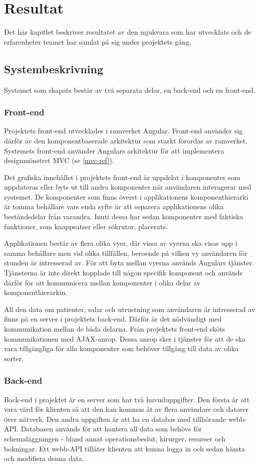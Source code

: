 \chapter{Resultat}
Det här kapitlet beskriver resultatet av den mjukvara som har utvecklats och de erfarenheter
teamet har samlat på sig under projektets gång.

\section{Systembeskrivning}
Systemet som skapats består av två separata delar, en back-end och en front-end.

\subsection{Front-end}
Projektets front-end utvecklades i ramverket Angular. Front-end använder sig därför av den komponentbaserade arkitektur som starkt förordas av ramverket. Systemets front-end använder Angulars arkitektur för att implementera designmönstret MVC (se \ref{mvc-ref}).

Det grafiska innehållet i projektets front-end är uppdelat i komponenter som uppdateras eller byts ut till andra komponenter när användaren interagerar med systemet. De komponenter som finns överst i applikationens komponenthierarki är tomma behållare vars enda syfte är att separera applikationens olika beståndsdelar från varandra. Inuti dessa har sedan komponenter med faktiska funktioner, som knappsatser eller sökrutor, placerats.

Applikationen består av flera olika vyer, där vissa av vyerna ska visas upp i samma behållare men vid olika tillfällen, beroende på vilken vy användaren för stunden är intresserad av. För att byta mellan vyerna används Angulars tjänster. Tjänsterna är inte direkt kopplade till någon specifik komponent och används därför för att kommunicera mellan komponenter i olika delar av komponenthierarkin.

All den data om patienter, salar och utrustning som användaren är intresserad av finns på en server i projektets back-end. Därför är det nödvändigt med kommunikation mellan de båda delarna. Från projektets front-end sköts kommunikationen med AJAX-anrop. Dessa anrop sker i tjänster för att de ska vara tillgängliga för alla komponenter som behöver tillgång till data av olika sorter.

\subsection{Back-end}
Back-end i projektet är en server som har två huvuduppgifter. Den första är att vara värd för klienten så att den kan kommas åt av flera användare och datorer över nätverk. Den andra uppgiften är att ha en databas med tillhörande webb-API. Databasen används för att hantera all data som behövs för schemaläggningen - bland annat operationsbeslut, kirurger, resurser och bokningar. Ett webb-API tillåter klienten att kunna logga in och sedan hämta och modifiera denna data.

